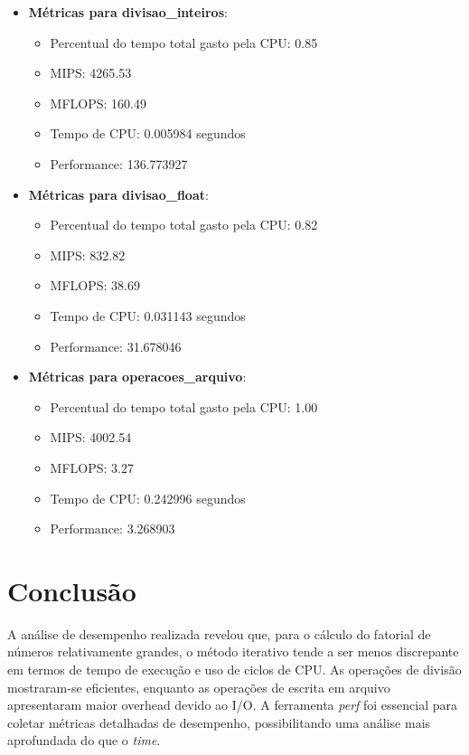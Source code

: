 \documentclass[12pt]{article}
\begin{document}
\begin{itemize}
    \item \textbf{Métricas para divisao\_inteiros}:
    \begin{itemize}
        \item Percentual do tempo total gasto pela CPU: 0.85
        \item MIPS: 4265.53
        \item MFLOPS: 160.49
        \item Tempo de CPU: 0.005984 segundos
        \item Performance: 136.773927
    \end{itemize}

    \item \textbf{Métricas para divisao\_float}:
    \begin{itemize}
        \item Percentual do tempo total gasto pela CPU: 0.82
        \item MIPS: 832.82
        \item MFLOPS: 38.69
        \item Tempo de CPU: 0.031143 segundos
        \item Performance: 31.678046
    \end{itemize}

    \item \textbf{Métricas para operacoes\_arquivo}:
    \begin{itemize}
        \item Percentual do tempo total gasto pela CPU: 1.00
        \item MIPS: 4002.54
        \item MFLOPS: 3.27
        \item Tempo de CPU: 0.242996 segundos
        \item Performance: 3.268903
    \end{itemize}
\end{itemize}

\newpage

\section{Conclusão}
A análise de desempenho realizada revelou que, para o cálculo do fatorial de números relativamente grandes, o método iterativo tende a ser menos discrepante em termos de tempo de execução e uso de ciclos de CPU. As operações de divisão mostraram-se eficientes, enquanto as operações de escrita em arquivo apresentaram maior overhead devido ao I/O. A ferramenta \textit{perf} foi essencial para coletar métricas detalhadas de desempenho, possibilitando uma análise mais aprofundada do que o \textit{time}.
\end{document}
